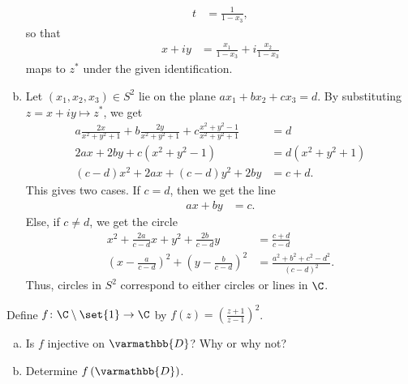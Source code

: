 \documentclass[11pt]{mypackage}
\renewcommand*{\mathbb}[1]{\varmathbb{#1}}
\begin{document}
\begin{solution}
\begin{enumerate}[(a)]
\begin{align*}
        t &= \frac{1}{1-x_3},
      \end{align*}
      so that
      \begin{align*}
        x+iy &= \frac{x_1}{1-x_3} + i\frac{x_2}{1-x_3}
      \end{align*}
      maps to $z^{\ast}$ under the given identification.
    \item Let $\left( x_1,x_2,x_3 \right)\in S^{2}$ lie on the plane $ax_1 + bx_2 + cx_3 = d$. By substituting $z = x+ iy \mapsto z^{\ast}$, we get
      \begin{align*}
        a \frac{2x}{x^2 + y^2 + 1} + b\frac{2y}{x^2 + y^2 + 1} + c \frac{x^2 + y^2 - 1}{x^2 + y^2 + 1} &= d\\
        2ax + 2by + c\left( x^2 + y^2 - 1 \right) &= d\left( x^2 + y^2 + 1 \right)\\
        \left( c-d \right)x^2 + 2ax + \left( c-d \right)y^2 + 2by &= c + d.
      \end{align*}
      This gives two cases. If $c = d$, then we get the line
      \begin{align*}
        ax + by &= c.
      \end{align*}
      Else, if $c \neq d$, we get the circle
      \begin{align*}
        x^2 + \frac{2a}{c-d}x + y^2 + \frac{2b}{c-d}y &= \frac{c+d}{c-d}\\
        \left( x-\frac{a}{c-d} \right)^2 + \left( y - \frac{b}{c-d} \right)^2 &= \frac{a^2 + b^2 + c^2 - d^2}{\left( c-d \right)^2}.
      \end{align*}
      Thus, circles in $S^{2}$ correspond to either circles or lines in $\C$.
  \end{enumerate}
\end{solution}
\begin{problem}[Problem 2]
  Define $f\colon \C\setminus \set{1}\rightarrow \C$ by $f(z) = \left( \frac{z+1}{z-1} \right)^2$.
  \begin{enumerate}[(a)]
    \item Is $f$ injective on $ \mathbb{D} $? Why or why not?
    \item Determine $f\left( \mathbb{D} \right)$.
  \end{enumerate}
\end{problem}
\end{document}

